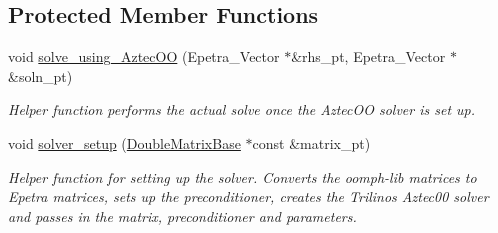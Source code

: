 \subsection*{Protected Member Functions}
\begin{DoxyCompactItemize}
\item 
void \hyperlink{classoomph_1_1TrilinosAztecOOSolver_a419638218c26238bab55674304c5fc98}{solve\+\_\+using\+\_\+\+Aztec\+OO} (Epetra\+\_\+\+Vector $\ast$\&rhs\+\_\+pt, Epetra\+\_\+\+Vector $\ast$\&soln\+\_\+pt)
\begin{DoxyCompactList}\small\item\em Helper function performs the actual solve once the Aztec\+OO solver is set up. \end{DoxyCompactList}\item 
void \hyperlink{classoomph_1_1TrilinosAztecOOSolver_a1d5e7dfc9fe3c890569465a167c2f2fc}{solver\+\_\+setup} (\hyperlink{classoomph_1_1DoubleMatrixBase}{Double\+Matrix\+Base} $\ast$const \&matrix\+\_\+pt)
\begin{DoxyCompactList}\small\item\em Helper function for setting up the solver. Converts the oomph-\/lib matrices to Epetra matrices, sets up the preconditioner, creates the Trilinos Aztec00 solver and passes in the matrix, preconditioner and parameters. \end{DoxyCompactList}\end{DoxyCompactItemize}
